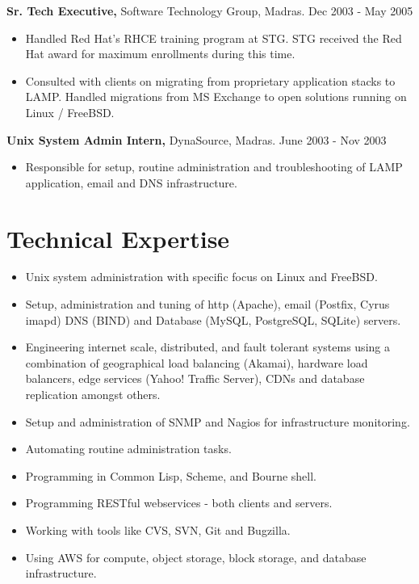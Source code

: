 \documentclass[margin]{res}
\begin{document}
\begin{resume}
\begin{itemize}
 \end{itemize}

{\bf Sr. Tech Executive,} Software Technology Group, Madras. \hfill Dec 2003 - May 2005
 \begin{itemize} \itemsep -2pt
 \item Handled Red Hat's RHCE training program at STG. STG received the Red Hat
   award for maximum enrollments during this time.
 \item Consulted with clients on migrating from proprietary application stacks
   to LAMP. Handled migrations from MS Exchange to open solutions running on 
   Linux / FreeBSD.
   
 \end{itemize}

{\bf Unix System Admin Intern,} DynaSource, Madras. \hfill June 2003 - Nov 2003
 \begin{itemize} \itemsep -2pt
 \item Responsible for setup, routine administration and troubleshooting 
   of LAMP \\ application, email and DNS infrastructure.
   
 \end{itemize}

\section{Technical Expertise} 
 \begin{itemize} \itemsep -2pt
 \item Unix system administration with specific focus on Linux and FreeBSD.
 \item Setup, administration and tuning of http (Apache), email (Postfix, Cyrus imapd)
   DNS (BIND) and Database (MySQL, PostgreSQL, SQLite) servers.
 \item Engineering internet scale, distributed, and fault tolerant systems 
   using a \\ combination of geographical load balancing (Akamai), hardware load 
   balancers, edge services (Yahoo! Traffic Server), CDNs  and database replication 
   amongst others.
 \item Setup and administration of SNMP and Nagios for infrastructure monitoring.
 \item Automating routine administration tasks.
 \item Programming in Common Lisp, Scheme, and Bourne shell.
 \item Programming RESTful webservices - both clients and servers.
 \item Working with tools like CVS, SVN, Git and Bugzilla.
 \item Using AWS for compute, object storage, block storage, and database \\ 
   infrastructure.


\end{itemize}
\end{resume}
\end{document}

